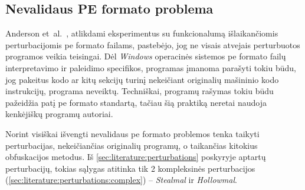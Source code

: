 \subsection{Nevalidaus PE formato problema}\label{sec:literature:pe_invalid}

Anderson et~al.~\cite{andersonLearningEvadeStatic2018}, atlikdami eksperimentus su funkcionalumą išlaikančiomis perturbacijomis \acs{pe} formato failams, pastebėjo, jog ne visais atvejais perturbuotos programos veikia teisingai. Dėl \textit{Windows} operacinės sistemos \acs{pe} formato failų interpretavimo ir paleidimo specifikos, programas įmanoma parašyti tokiu būdu, jog pakeitus kodo ar kitų sekcijų turinį nekeičiant originalių mašininio kodo instrukcijų, programa neveiktų. Techniškai, programų rašymas tokiu būdu pažeidžia patį \acs{pe} formato standartą, tačiau šią praktiką neretai naudoja kenkėjiškų programų autoriai.

Norint visiškai išvengti nevalidaus \acs{pe} formato problemos tenka taikyti perturbacijas, nekeičiančias originalių programų, o taikančias kitokius obfuskacijos metodus. Iš \ref{sec:literature:perturbations} poskyryje aptartų perturbacijų, tokias sąlygas atitinka tik 2 kompleksinės perturbacijos (\ref{sec:literature:perturbations:complex}) -- \textit{Stealmal} ir \textit{Hollowmal}.